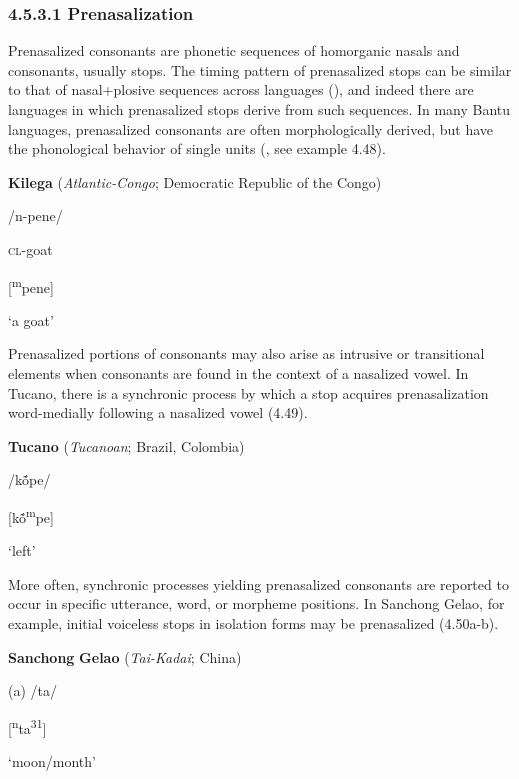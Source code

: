 \subsubsection{\textbf{4.5.3.1} \textbf{Prenasalization} }

  Prenasalized consonants are phonetic sequences of homorganic nasals and consonants, usually stops. The timing pattern of prenasalized stops can be similar to that of nasal+plosive sequences across languages (\citealt{BrowmanGoldstein1986}), and indeed there are languages in which prenasalized stops derive from such sequences. In many Bantu languages, prenasalized consonants are often morphologically derived, but have the phonological behavior of single units (\citealt{Tak2011}, see example 4.48).

\ea\label{ex:(4.48)}
  \textbf{Kilega} (\textit{Atlantic-Congo}; Democratic Republic of the Congo)

/n-pene/

\textsc{cl}{}-goat

[\textsuperscript{m}pene]

‘a goat’

\citep[132]{Tak2011}

\z

  Prenasalized portions of consonants may also arise as intrusive or transitional elements when consonants are found in the context of a nasalized vowel. In Tucano, there is a synchronic process by which a stop acquires prenasalization word-medially following a nasalized vowel (4.49).

\ea\label{ex:(4.49)}
  \textbf{Tucano} (\textit{Tucanoan}; Brazil, Colombia)

/kṍpe/

[kṍ\textsuperscript{m}pe]

‘left’

\citep[11]{West1980}

\z

  More often, synchronic processes yielding prenasalized consonants are reported to occur in specific utterance, word, or morpheme positions. In Sanchong Gelao, for example, initial voiceless stops in isolation forms may be prenasalized (4.50a-b).

\ea\label{ex:(4.50)}
  \textbf{Sanchong} \textbf{Gelao} (\textit{Tai-Kadai}; China)

(a)  /ta/

  [\textsuperscript{n}ta\textsuperscript{31}]

  ‘moon/month’

